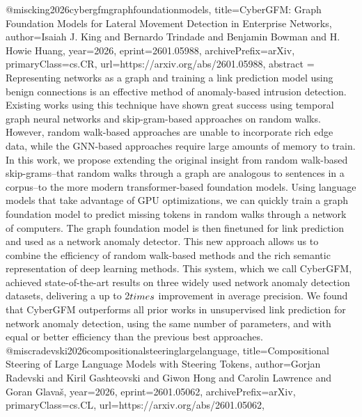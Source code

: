 {}@misc{king2026cybergfmgraphfoundationmodels,
      title={CyberGFM: Graph Foundation Models for Lateral Movement Detection in Enterprise Networks}, 
      author={Isaiah J. King and Bernardo Trindade and Benjamin Bowman and H. Howie Huang},
      year={2026},
      eprint={2601.05988},
      archivePrefix={arXiv},
      primaryClass={cs.CR},
      url={https://arxiv.org/abs/2601.05988},
      abstract = {Representing networks as a graph and training a link prediction model using benign connections is an effective method of anomaly-based intrusion detection. Existing works using this technique have shown great success using temporal graph neural networks and skip-gram-based approaches on random walks. However, random walk-based approaches are unable to incorporate rich edge data, while the GNN-based approaches require large amounts of memory to train. In this work, we propose extending the original insight from random walk-based skip-grams--that random walks through a graph are analogous to sentences in a corpus--to the more modern transformer-based foundation models. Using language models that take advantage of GPU optimizations, we can quickly train a graph foundation model to predict missing tokens in random walks through a network of computers. The graph foundation model is then finetuned for link prediction and used as a network anomaly detector. This new approach allows us to combine the efficiency of random walk-based methods and the rich semantic representation of deep learning methods. This system, which we call CyberGFM, achieved state-of-the-art results on three widely used network anomaly detection datasets, delivering a up to 2$\\times$ improvement in average precision. We found that CyberGFM outperforms all prior works in unsupervised link prediction for network anomaly detection, using the same number of parameters, and with equal or better efficiency than the previous best approaches.}
}@misc{radevski2026compositionalsteeringlargelanguage,
      title={Compositional Steering of Large Language Models with Steering Tokens}, 
      author={Gorjan Radevski and Kiril Gashteovski and Giwon Hong and Carolin Lawrence and Goran Glavaš},
      year={2026},
      eprint={2601.05062},
      archivePrefix={arXiv},
      primaryClass={cs.CL},
      url={https://arxiv.org/abs/2601.05062},
}
